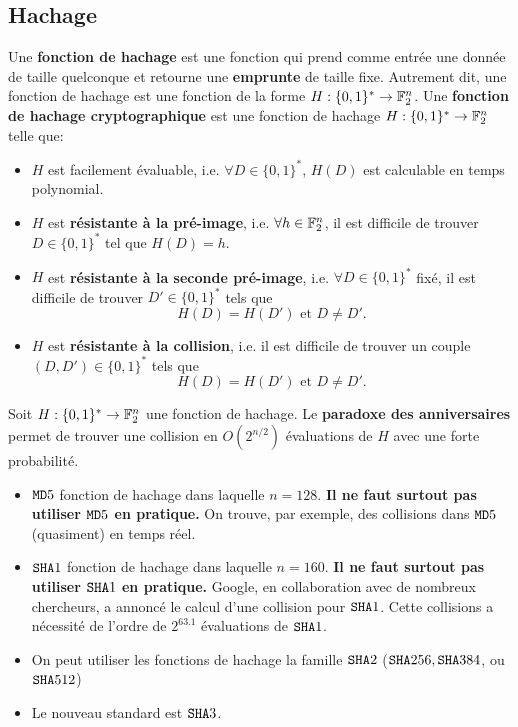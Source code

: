\documentclass{llncs}[11pt]
\begin{document}
\subsection{Hachage}
\begin{definition}
Une {\bf fonction de hachage} est une fonction qui prend comme entrée une donnée de taille quelconque et retourne une {\bf emprunte} de taille fixe.
Autrement dit, une fonction de hachage est une fonction de la forme  
$H : \{0,1\}^* \to  \mathbb{F}_2^n$.
Une {\bf fonction de hachage cryptographique} est une fonction de hachage
$H : \{0,1\}^* \to  \mathbb{F}_2^n$ telle que:
\begin{itemize}
\item $H$ est facilement évaluable, i.e. $\forall D \in  \{0,1\}^*$, $ H(D)$ est calculable en temps polynomial.
\item $H$ est {\bf résistante à la pré-image}, i.e. $\forall h \in \mathbb{F}_2^n$, il est difficile  de trouver $D \in  \{0,1\}^*$ tel que  $ H(D)=h$.  
\item $H$ est {\bf résistante à la seconde  pré-image}, i.e. $\forall D \in \{0,1\}^*$ fixé, il est difficile de trouver $D' \in  \{0,1\}^*$ tels que 
$$
H(D)=H(D') \mbox{ et }  D \not =D'.
$$  
\item $H$ est {\bf résistante à la collision}, i.e. il est difficile de trouver un 
couple $(D,D') \in \{0,1\}^*$ tels que 
$$
H(D)=H(D') \mbox{ et }  D \not =D'.
$$  
\end{itemize}

\end{definition}

\begin{remark}
Soit  $H : \{0,1\}^* \to  \mathbb{F}_2^n$ une fonction de hachage. Le {\bf paradoxe des anniversaires} permet de trouver une collision en $O(2^{n/2})$ évaluations de $H$ avec une forte probabilité.     
\end{remark}

\begin{remark}
\begin{itemize}
\item ${\tt MD}5$ fonction de hachage dans laquelle $n=128$. {\bf Il ne faut surtout pas utiliser ${\tt MD}5$ en pratique.} On trouve, par exemple, des collisions dans ${\tt MD}5$ (quasiment) en temps réel.  
\item ${\tt SHA}1$ fonction de hachage dans laquelle $n=160$. {\bf Il ne faut surtout pas utiliser ${\tt SHA}1$ en pratique.} Google, en collaboration avec de nombreux chercheurs, a annoncé le calcul d'une collision pour ${\tt SHA}1$. Cette collisions a nécessité de l'ordre de $2^{63.1}$ évaluations de ${\tt SHA}1$.
\item On peut utiliser  les fonctions de hachage la famille ${\tt SHA}2$ (${\tt SHA}256,{\tt SHA}384$, ou ${\tt SHA}512$)
\item Le nouveau standard est  ${\tt SHA}3$.
\end{itemize}
\end{remark}
\end{document}
